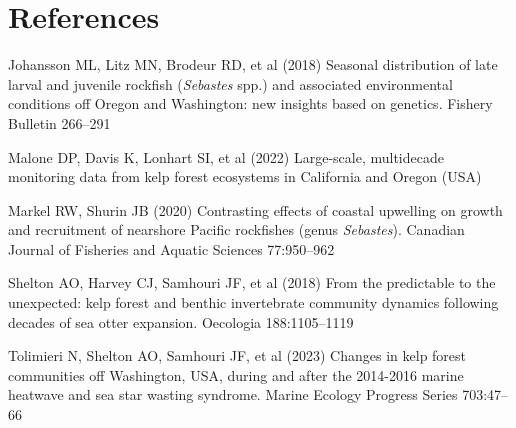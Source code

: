 \documentclass[
  letterpaper,
  DIV=11,
  numbers=noendperiod]{scrartcl}
\newlength{\cslhangindent}
\newlength{\cslentryspacingunit} %
\newenvironment{CSLReferences}[2] %
 {%
  \setlength{\parindent}{0pt}
  \ifodd #1
  \let\oldpar\par
  \def\par{\hangindent=\cslhangindent\oldpar}
  \fi
  \setlength{\parskip}{#2\cslentryspacingunit}
 }%
 {}
\begin{document}
\newpage

\hypertarget{references}{%
\section{References}\label{references}}

\hypertarget{refs}{}
\begin{CSLReferences}{1}{0}
\leavevmode{}%
Johansson ML, Litz MN, Brodeur RD, et al (2018) {Seasonal distribution
of late larval and juvenile rockfish (\emph{Sebastes} spp.) and
associated environmental conditions off Oregon and Washington: new
insights based on genetics}. Fishery Bulletin 266--291

\leavevmode{}%
Malone DP, Davis K, Lonhart SI, et al (2022) {Large-scale, multidecade
monitoring data from kelp forest ecosystems in California and Oregon
(USA)}

\leavevmode{}%
Markel RW, Shurin JB (2020) {Contrasting effects of coastal upwelling on
growth and recruitment of nearshore Pacific rockfishes (genus
\emph{Sebastes})}. Canadian Journal of Fisheries and Aquatic Sciences
77:950--962

\leavevmode{}%
Shelton AO, Harvey CJ, Samhouri JF, et al (2018) {From the predictable
to the unexpected: kelp forest and benthic invertebrate community
dynamics following decades of sea otter expansion}. Oecologia
188:1105--1119

\leavevmode{}%
Tolimieri N, Shelton AO, Samhouri JF, et al (2023) {Changes in kelp
forest communities off Washington, USA, during and after the 2014-2016
marine heatwave and sea star wasting syndrome}. Marine Ecology Progress
Series 703:47--66

\end{CSLReferences}
\end{document}
